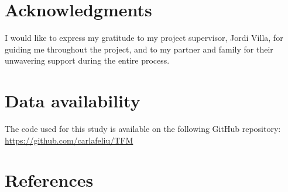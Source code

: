 \documentclass[final,times,twocolumn,article]{elsarticle}
\begin{document}
\appendix

\section{Acknowledgments}

I would like to express my gratitude to my project supervisor, Jordi Villa, for guiding me throughout the project, and to my partner and family for their unwavering support during the entire process.

\section{Data availability}

The code used for this study is available on the following GitHub repository: \href{https://github.com/carlafeliu/TFM}{https://github.com/carlafeliu/TFM}


\section{References}
 

\end{document}
